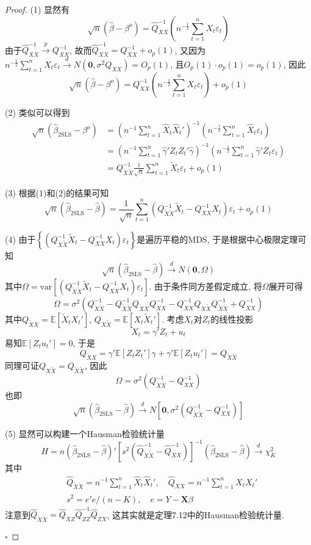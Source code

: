 \documentclass[cn,12pt,math=mtpro2,citestyle=gb7714-2015,bibstyle=gb7714-2015,twocol,mode=simple]{elegantbook}
\newcommand{\E}{\mathbb{E}}
\newcommand{\hbeta}{\hat{\beta}}
\newcommand{\btls}{\hat{\beta}_{\text{2SLS}}}
\newcommand{\QXZ}{\hat{Q}_{XZ}}
\newcommand{\QZZ}{\hat{Q}_{ZZ}}
\newcommand{\QZX}{\hat{Q}_{ZX}}
\begin{document}
\begin{proof}
  (1) 显然有
  $$\sqrt{n}(\hbeta-\beta^o)=\hat{Q}_{XX}^{-1}\left(n^{-\frac{1}{2}}\sum_{t=1}^{n}X_t\varepsilon_t\right)$$
  由于$\hat{Q}_{XX}^{-1}\xrightarrow{p} Q_{XX}^{-1}$, 故而$\hat{Q}_{XX}^{-1}=Q_{XX}^{-1}+o_p(1)$, 又因为$\displaystyle n^{-\frac{1}{2}}\sum_{t=1}^{n}X_t\varepsilon_t\xrightarrow{d} N(\mathbf{0},\sigma^2Q_{XX})=O_p(1)$, 且$O_p(1)\cdot o_p(1)=o_p(1)$, 因此
  $$\sqrt{n}(\hbeta-\beta^o)=Q_{XX}^{-1}\left(n^{-\frac{1}{2}}\sum_{t=1}^{n}X_t\varepsilon_t\right)+o_p(1)$$

  (2) 类似可以得到
  \begin{align*}
  \sqrt{n}(\btls-\beta^o)&=\left(n^{-1}\sum_{t=1}^{n}\hat{X}_t\hat{X}_t'\right)^{-1}\left(n^{-\frac{1}{2}}\sum_{t=1}^{n}\hat{X}_t\varepsilon_t\right) \\
  &=\left(n^{-1}\sum_{t=1}^{n}\hat{\gamma}'Z_tZ_t'\hat{\gamma}\right)^{-1}\left(n^{-\frac{1}{2}}\sum_{t=1}^{n}\hat{\gamma}'Z_t\varepsilon_t\right) \\
  &=Q_{\tilde{X}\tilde{X}}^{-1}\frac{1}{\sqrt{n}}\sum_{t=1}^{n}\tilde{X}_t\varepsilon_t+o_p(1)
  \end{align*}

  (3) 根据(1)和(2)的结果可知
  $$\sqrt{n}(\btls-\hbeta)=\frac{1}{\sqrt{n}}\sum_{t=1}^{n}\left(Q_{\tilde{X}\tilde{X}}^{-1}\tilde{X}_t-Q_{XX}^{-1}X_t\right)\varepsilon_t+o_p(1)$$

  (4) 由于$\left\{\left(Q_{\tilde{X}\tilde{X}}^{-1}\tilde{X}_t-Q_{XX}^{-1}X_t\right)\varepsilon_t\right\}$是遍历平稳的MDS, 于是根据中心极限定理可知
  $$\sqrt{n}(\btls-\hbeta)\xrightarrow{d}N(\mathbf{0},\Omega)$$
  其中$\Omega=\text{var}\left[\left(Q_{\tilde{X}\tilde{X}}^{-1}\tilde{X}_t-Q_{XX}^{-1}X_t\right)\varepsilon_t\right]$. 由于条件同方差假定成立, 将$\Omega$展开可得
  $$\Omega=\sigma^2\left(Q_{\tilde{X}\tilde{X}}^{-1}-Q_{\tilde{X}\tilde{X}}^{-1}Q_{\tilde{X}X}Q_{XX}^{-1}-Q_{XX}^{-1}Q_{X\tilde{X}}Q_{\tilde{X}\tilde{X}}^{-1}+Q_{XX}^{-1}\right)$$
  其中$Q_{\tilde{X}X}=\E[\tilde{X}_tX_t']$, $Q_{X\tilde{X}}=\E[X_t\tilde{X}_t']$. 考虑$X_t$对$Z_t$的线性投影
  $$X_t=\gamma'Z_t+u_t$$
  易知$\E[Z_tu_t']=0$, 于是
  $$Q_{\tilde{X}X}=\gamma' \E[Z_tZ_t']\gamma+\gamma'\E[Z_tu_t']=Q_{\tilde{X}\tilde{X}}$$
  同理可证$Q_{X\tilde{X}}=Q_{\tilde{X}\tilde{X}}$, 因此
  $$\Omega=\sigma^2\left(Q_{\tilde{X}\tilde{X}}^{-1}-Q_{XX}^{-1}\right)$$
  也即
  $$\sqrt{n}(\btls-\hbeta)\xrightarrow{d}N\left[\mathbf{0},\sigma^2\left(Q_{\tilde{X}\tilde{X}}^{-1}-Q_{XX}^{-1}\right)\right]$$

  (5) 显然可以构建一个Hausman检验统计量
  $$H=n(\btls-\hbeta)'\left[s^2\left(\hat{Q}_{\tilde{X}\tilde{X}}^{-1}-\hat{Q}_{XX}^{-1}\right)\right]^{-1}(\btls-\hbeta)\xrightarrow{d}\chi_K^2$$
  其中
  \begin{align*}
  &\hat{Q}_{\tilde{X}\tilde{X}}=n^{-1}\sum_{t=1}^{n}\hat{X}_t\hat{X}_t',\quad \hat{Q}_{XX}=n^{-1}\sum_{t=1}^{n}X_tX_t' \\
  &s^2=e'e/(n-K),\quad e=Y-\mathbf{X}\hbeta
  \end{align*}
  注意到$\hat{Q}_{\tilde{X}\tilde{X}}=\QXZ\QZZ^{-1}\QZX$, 这其实就是定理7.12中的Hausman检验统计量.

  $\square$
\end{proof}
\end{document}
